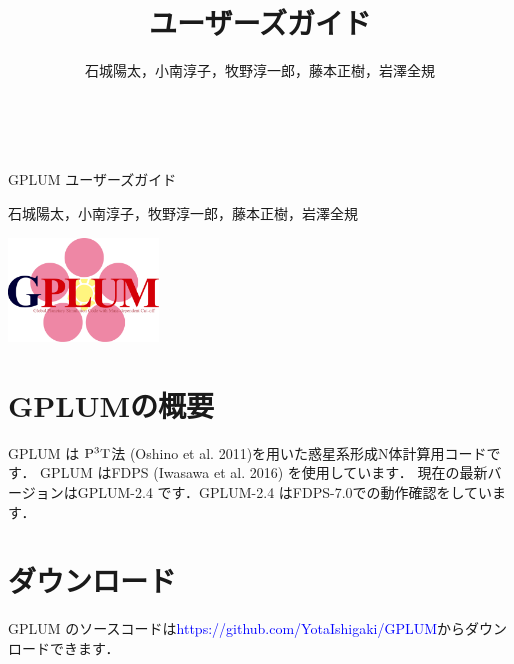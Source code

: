 \documentclass[12pt,a4paper,dvipdfmx]{jsarticle}
\title{\ourcode ユーザーズガイド}
\author{石城陽太，小南淳子，牧野淳一郎，藤本正樹，岩澤全規}
\newcommand{\ourcode}{GPLUM\xspace}
\newcommand{\ourcodeR}{GPLUM-2.4\xspace}
\begin{document}

　\vspace{5mm}

\begin{center}
\hspace{27mm} {\huge \ourcode ユーザーズガイド}

\vspace{7mm}

\hspace{39mm} {\large 石城陽太，小南淳子，牧野淳一郎，藤本正樹，岩澤全規}
\end{center}

\begin{flushleft}
\vspace{-27mm}
\hspace{1mm} \includegraphics[width=4cm]{GPLUM_logo.pdf}
\end{flushleft}

\vspace{15mm}


\tableofcontents



\newpage

\section{GPLUMの概要}

\ourcode は ${\rm P^{3}T}$法 (Oshino et al. 2011)を用いた惑星系形成N体計算用コードです．
\ourcode はFDPS (Iwasawa et al. 2016) を使用しています．
現在の最新バージョンは\ourcodeR です．\ourcodeR はFDPS-7.0での動作確認をしています．


\section{ダウンロード}
\ourcode のソースコードは\textcolor{blue}{https://github.com/YotaIshigaki/GPLUM}からダウンロードできます．
\end{document}

